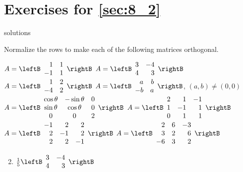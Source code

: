 
\section*{Exercises for \ref{sec:8_2}}

\begin{Filesave}{solutions}
\end{Filesave}

\begin{multicols}{2}
\begin{ex}
Normalize the rows to make each of the following matrices orthogonal.

\begin{exenumerate}[column-sep=-5em]
\exitem $A = \leftB \begin{array}{rr}
1 & 1 \\
-1 & 1
\end{array}\rightB$
\exitem $A = \leftB \begin{array}{rr}
3 & -4 \\
4 & 3
\end{array}\rightB$
\exitem* $A = \leftB \begin{array}{rr}
1 & 2 \\
-4 & 2
\end{array}\rightB$
\exitem* $A = \leftB \begin{array}{rr}
a & b \\
-b & a
\end{array}\rightB$, $(a,b) \neq (0,0)$
\exitem* $A = \leftB \begin{array}{ccc}
\cos\theta & -\sin\theta & 0 \\
\sin\theta & \cos\theta & 0 \\
0 & 0 & 2 
\end{array}\rightB$
\exitem* $A = \leftB \begin{array}{rrr}
2 & 1 & -1 \\
1 & -1 & 1 \\
0 & 1 & 1 
\end{array}\rightB$
\exitem* $A = \leftB \begin{array}{rrr}
-1 & 2 & 2 \\
2 & -1 & 2 \\
2 & 2 & -1 
\end{array}\rightB$
\exitem* $A = \leftB \begin{array}{rrr}
2 & 6 & -3 \\
3 & 2 & 6 \\
-6 & 3 & 2 
\end{array}\rightB$
\end{exenumerate}
\begin{sol}
\begin{enumerate}[label={\alph*.}]
\setcounter{enumi}{1}
\item  $\frac{1}{5}\leftB \begin{array}{rr}
3 & -4 \\
4 & 3
\end{array}\rightB$


\end{enumerate}
\end{sol}
\end{ex}
\end{multicols}
